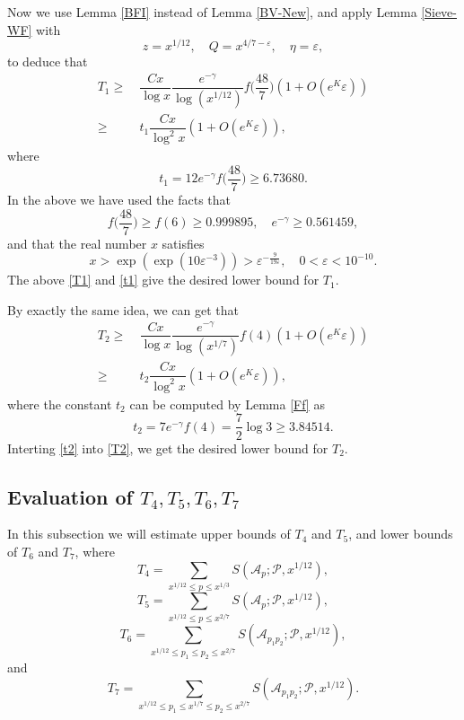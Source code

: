 \documentclass[12pt, a4paper]{amsart}
\def\leq{\leqslant}
\def\le{\leqslant}
\def\ge{\geqslant}
\theoremstyle{plain}
\theoremstyle{remark}
\numberwithin{equation}{section}
\begin{document}
Now we use Lemma \ref{BFI} instead of Lemma \ref{BV-New}, and apply Lemma \ref{Sieve-WF} with
\[
z=x^{1/12},\quad Q=x^{4/7-\varepsilon}, \quad \eta=\varepsilon,
\]
to deduce that
\begin{equation}\label{T1}
\begin{aligned}
T_1\ge\ & \dfrac{Cx}{\log x}\dfrac{e^{-\gamma}}{\log (x^{1/12})}f\bigg(\dfrac{48}{7}\bigg) (1+O(e^K\varepsilon))\\
\ge\ & t_1 \dfrac{Cx}{\log^2 x}(1+O(e^K\varepsilon)),
\end{aligned}
\end{equation}
where
\begin{equation}\label{t1}
t_1=12e^{-\gamma}f\bigg(\dfrac{48}{7}\bigg)\ge 6.73680.
\end{equation}
In the above we have used the facts that
\begin{equation}\label{f8,E-gamma}
f\bigg(\dfrac{48}{7}\bigg)\ge f(6)\ge 0.999895, \quad e^{-\gamma}\ge 0.561459,
\end{equation}
and that the real number $x$ satisfies
\begin{equation}\label{T1Error}
x>\exp(\exp(10\varepsilon^{-3}))>\varepsilon^{-\frac{9}{19\varepsilon}},\quad 0<\varepsilon<10^{-10}.
\end{equation}
The above \eqref{T1} and \eqref{t1} give the desired lower bound for $T_1$.

By exactly the same idea, we can get that
\begin{equation}\label{T2}
\begin{aligned}
T_2\ge\ & \dfrac{Cx}{\log x}\dfrac{e^{-\gamma}}{\log (x^{1/7})}f(4) (1+O(e^K\varepsilon))\\
\ge\ & t_2\dfrac{Cx}{\log^2 x}(1+O(e^K\varepsilon)),
\end{aligned}
\end{equation}
where the constant $t_2$ can be computed by Lemma \ref{Ff} as 
\begin{equation}\label{t2}
t_2=7e^{-\gamma}f(4)
=\frac{7}{2}\log 3 
\ge 3.84514.
\end{equation}
Interting \eqref{t2} into \eqref{T2}, we get the desired lower bound for $T_2$.
	
\subsection{Evaluation of $T_4,T_5,T_6,T_7$}
In this subsection we will estimate upper bounds of $T_4$ and $T_5$, and lower bounds of $T_6$ and $T_7$, 
where
\[
T_4 = \sum_{x^{1/12} \leq p \le x^{1/3}} S(\mathscr{A}_p; \mathscr{P}, x^{1/12}), 
\]
\[
T_5 = \sum_{x^{1/12} \leq p \le x^{2/7}} S(\mathscr{A}_p; \mathscr{P}, x^{1/12}),
\]
\[ 
T_6 = \sum_{x^{1/12} \leq p_1 \le p_2 \le x^{2/7}} S(\mathscr{A}_{p_1 p_2}; \mathscr{P}, x^{1/12}),
\] 
and 
\[
T_7 = \sum_{x^{1/12} \leq p_1 \le x^{1/7} \le p_2 \le x^{2/7}} S(\mathscr{A}_{p_1 p_2}; \mathscr{P}, x^{1/12}).
\] 
\end{document}
